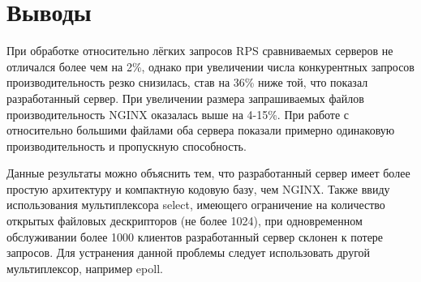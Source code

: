 \section{Выводы}

При обработке относительно лёгких запросов RPS сравниваемых серверов не отличался более чем на 2\%, однако при увеличении числа конкурентных запросов производительность резко снизилась, став на 36\% ниже той, что показал разработанный сервер. При увеличении размера запрашиваемых файлов производительность NGINX оказалась выше на 4-15\%. При работе с относительно большими файлами оба сервера показали примерно одинаковую производительность и пропускную способность.

Данные результаты можно объяснить тем, что разработанный сервер имеет более простую архитектуру и компактную кодовую базу, чем NGINX. Также ввиду использования мультиплексора select, имеющего ограничение на количество открытых файловых дескрипторов (не более 1024), при одновременном обслуживании более 1000 клиентов разработанный сервер склонен к потере запросов. Для устранения данной проблемы следует использовать другой мультиплексор, например epoll.
